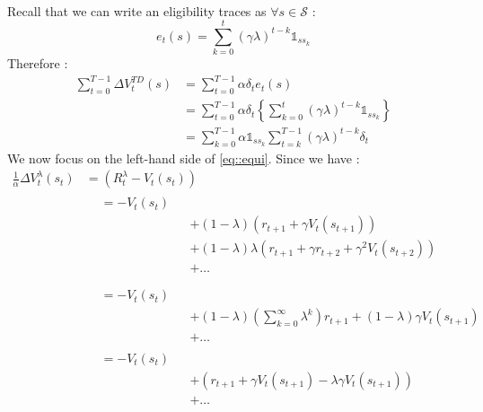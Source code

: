 \documentclass[a4paper]{article}
\newcommand\mS{\mathcal{S}}
\begin{document}
{		\paragraph{} Recall that we can write an eligibility traces as $\forall s \in \mS$ :  
		\begin{equation}
			e_t(s) = \sum_{k=0}^t (\gamma \lambda)^{t-k}\mathds{1}_{ss_k}
		\end{equation}
		Therefore : 
		\begin{equation}
			\begin{aligned}
				\sum_{t=0}^{T-1}\Delta V_t^{TD}(s) &= \sum_{t=0}^{T-1} \alpha \delta_t e_t(s) \\
										      &= \sum_{t=0}^{T-1} \alpha \delta_t \left\{ \sum_{k=0}^t (\gamma \lambda)^{t-k}\mathds{1}_{ss_k}\right\}\\
										      &= \sum_{k=0}^{T-1} \alpha \mathds{1}_{ss_k} \sum_{t=k}^{T-1} (\gamma \lambda)^{t-k}\delta_t
			\end{aligned}
		\end{equation}
		We now focus on the left-hand side of \eqref{eq::equi}. Since we have : 
		$$
			\begin{aligned}
				\frac{1}{\alpha}\Delta V_t^\lambda(s_t) &= (R_t^\lambda - V_t(s_t))    \\
										&\begin{aligned}
											&= -V_t(s_t) && \\
											& &&+(1-\lambda)(r_{t+1}+\gamma V_t(s_{t+1}))  \\ 
											& &&+(1-\lambda)\lambda(r_{t+1} + \gamma r_{t+2} + \gamma^2 V_t(s_{t+2})) \\
										 	& &&+\hdots  \\
										\end{aligned}\\
										&\begin{aligned}
											&= -V_t(s_t) && \\
											& &&+ (1-\lambda)\left(\sum_{k=0}^\infty \lambda^k\right)r_{t+1} + (1-\lambda)\gamma V_t(s_{t+1})\\
											& &&+ \hdots 
										\end{aligned}\\
										&\begin{aligned}
											&= -V_t(s_t) && \\
											& &&+ (r_{t+1}+ \gamma V_t(s_{t+1}) - \lambda\gamma V_t(s_{t+1})) \\
											& &&+ \hdots 
										\end{aligned}\\

\end{aligned}$$}
\end{document}
